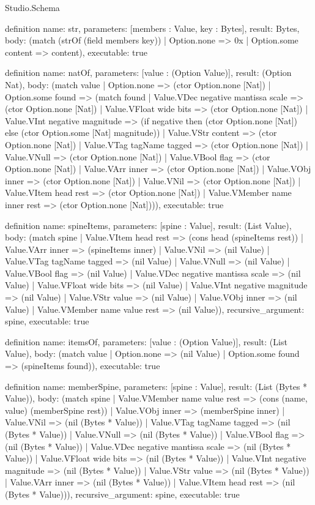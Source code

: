 \begin{lexlean}{Studio.Schema}
\begin{semanticmodule}
definition{
  name: str,
  parameters: [members : Value, key : Bytes],
  result: Bytes,
  body: (match (strOf (field members key))
    | Option.none => 0x
    | Option.some content => content),
  executable: true
}

definition{
  name: natOf,
  parameters: [value : (Option Value)],
  result: (Option Nat),
  body: (match value
    | Option.none => (ctor Option.none [Nat])
    | Option.some found => (match found
      | Value.VDec negative mantissa scale => (ctor Option.none [Nat])
      | Value.VFloat wide bits => (ctor Option.none [Nat])
      | Value.VInt negative magnitude => (if negative then (ctor Option.none [Nat]) else (ctor Option.some [Nat] magnitude))
      | Value.VStr content => (ctor Option.none [Nat])
      | Value.VTag tagName tagged => (ctor Option.none [Nat])
      | Value.VNull => (ctor Option.none [Nat])
      | Value.VBool flag => (ctor Option.none [Nat])
      | Value.VArr inner => (ctor Option.none [Nat])
      | Value.VObj inner => (ctor Option.none [Nat])
      | Value.VNil => (ctor Option.none [Nat])
      | Value.VItem head rest => (ctor Option.none [Nat])
      | Value.VMember name inner rest => (ctor Option.none [Nat]))),
  executable: true
}

definition{
  name: spineItems,
  parameters: [spine : Value],
  result: (List Value),
  body: (match spine
    | Value.VItem head rest => (cons head (spineItems rest))
    | Value.VArr inner => (spineItems inner)
    | Value.VNil => (nil Value)
    | Value.VTag tagName tagged => (nil Value)
    | Value.VNull => (nil Value)
    | Value.VBool flag => (nil Value)
    | Value.VDec negative mantissa scale => (nil Value)
    | Value.VFloat wide bits => (nil Value)
    | Value.VInt negative magnitude => (nil Value)
    | Value.VStr value => (nil Value)
    | Value.VObj inner => (nil Value)
    | Value.VMember name value rest => (nil Value)),
  recursive_argument: spine,
  executable: true
}

definition{
  name: itemsOf,
  parameters: [value : (Option Value)],
  result: (List Value),
  body: (match value
    | Option.none => (nil Value)
    | Option.some found => (spineItems found)),
  executable: true
}

definition{
  name: memberSpine,
  parameters: [spine : Value],
  result: (List (Bytes * Value)),
  body: (match spine
    | Value.VMember name value rest => (cons (name, value) (memberSpine rest))
    | Value.VObj inner => (memberSpine inner)
    | Value.VNil => (nil (Bytes * Value))
    | Value.VTag tagName tagged => (nil (Bytes * Value))
    | Value.VNull => (nil (Bytes * Value))
    | Value.VBool flag => (nil (Bytes * Value))
    | Value.VDec negative mantissa scale => (nil (Bytes * Value))
    | Value.VFloat wide bits => (nil (Bytes * Value))
    | Value.VInt negative magnitude => (nil (Bytes * Value))
    | Value.VStr value => (nil (Bytes * Value))
    | Value.VArr inner => (nil (Bytes * Value))
    | Value.VItem head rest => (nil (Bytes * Value))),
  recursive_argument: spine,
  executable: true
}


\end{semanticmodule}
\end{lexlean}
